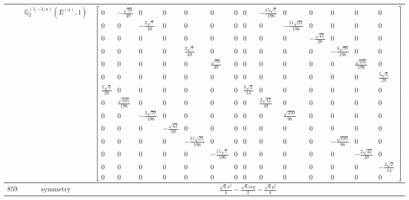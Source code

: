 \documentclass[fleqn,8pt,landscape]{jsarticle}
\begin{document}
\begin{longtable}{ccc}
$  $ & $ \mathbb{Q}_{2}^{(1,-1;a)}(E^{(a)},1) $ & $ \begin{bmatrix} 0 & - \frac{\sqrt{70}}{49} & 0 & 0 & 0 & 0 & 0 & 0 & - \frac{15 \sqrt{7}}{196} & 0 & 0 & 0 & 0 & 0 \\ 0 & 0 & - \frac{2 \sqrt{7}}{49} & 0 & 0 & 0 & 0 & 0 & 0 & - \frac{11 \sqrt{21}}{196} & 0 & 0 & 0 & 0 \\ 0 & 0 & 0 & 0 & 0 & 0 & 0 & 0 & 0 & 0 & - \frac{\sqrt{42}}{28} & 0 & 0 & 0 \\ 0 & 0 & 0 & 0 & \frac{2 \sqrt{7}}{49} & 0 & 0 & 0 & 0 & 0 & 0 & - \frac{3 \sqrt{70}}{196} & 0 & 0 \\ 0 & 0 & 0 & 0 & 0 & \frac{\sqrt{70}}{49} & 0 & 0 & 0 & 0 & 0 & 0 & \frac{\sqrt{105}}{196} & 0 \\ 0 & 0 & 0 & 0 & 0 & 0 & 0 & 0 & 0 & 0 & 0 & 0 & 0 & \frac{5 \sqrt{3}}{28} \\ \frac{5 \sqrt{3}}{28} & 0 & 0 & 0 & 0 & 0 & 0 & \frac{3 \sqrt{2}}{14} & 0 & 0 & 0 & 0 & 0 & 0 \\ 0 & \frac{\sqrt{105}}{196} & 0 & 0 & 0 & 0 & 0 & 0 & \frac{2 \sqrt{42}}{49} & 0 & 0 & 0 & 0 & 0 \\ 0 & 0 & - \frac{3 \sqrt{70}}{196} & 0 & 0 & 0 & 0 & 0 & 0 & \frac{\sqrt{210}}{98} & 0 & 0 & 0 & 0 \\ 0 & 0 & 0 & - \frac{\sqrt{42}}{28} & 0 & 0 & 0 & 0 & 0 & 0 & 0 & 0 & 0 & 0 \\ 0 & 0 & 0 & 0 & - \frac{11 \sqrt{21}}{196} & 0 & 0 & 0 & 0 & 0 & 0 & - \frac{\sqrt{210}}{98} & 0 & 0 \\ 0 & 0 & 0 & 0 & 0 & - \frac{15 \sqrt{7}}{196} & 0 & 0 & 0 & 0 & 0 & 0 & - \frac{2 \sqrt{42}}{49} & 0 \\ 0 & 0 & 0 & 0 & 0 & 0 & 0 & 0 & 0 & 0 & 0 & 0 & 0 & - \frac{3 \sqrt{2}}{14} \\ 0 & 0 & 0 & 0 & 0 & 0 & 0 & 0 & 0 & 0 & 0 & 0 & 0 & 0 \end{bmatrix} $ \\ \hline
$ 859 $ & $ \text{symmetry} $ & $ \frac{\sqrt{6} x^{2}}{4} - \frac{\sqrt{6} i x y}{2} - \frac{\sqrt{6} y^{2}}{4} $ \\

\end{longtable}
\end{document}
